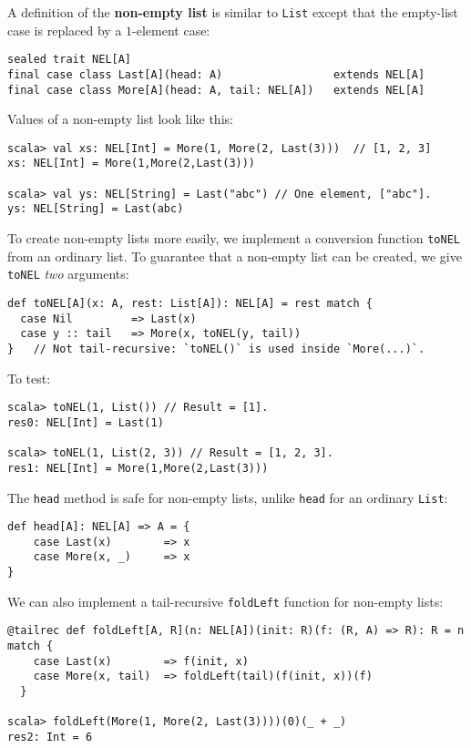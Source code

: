 A definition of the \textbf{non-empty list}
is similar to \lstinline!List! except that the empty-list case is
replaced by a $1$-element case:
\begin{lstlisting}
sealed trait NEL[A]
final case class Last[A](head: A)                 extends NEL[A]
final case class More[A](head: A, tail: NEL[A])   extends NEL[A]
\end{lstlisting}
Values of a non-empty list look like this:
\begin{lstlisting}
scala> val xs: NEL[Int] = More(1, More(2, Last(3)))  // [1, 2, 3]
xs: NEL[Int] = More(1,More(2,Last(3)))

scala> val ys: NEL[String] = Last("abc") // One element, ["abc"].
ys: NEL[String] = Last(abc)
\end{lstlisting}
To create non-empty lists more easily, we implement a conversion function
\lstinline!toNEL! from an ordinary list. To guarantee that a non-empty
list can be created, we give \lstinline!toNEL! \emph{two} arguments:
\begin{lstlisting}
def toNEL[A](x: A, rest: List[A]): NEL[A] = rest match {
  case Nil         => Last(x)
  case y :: tail   => More(x, toNEL(y, tail))
}   // Not tail-recursive: `toNEL()` is used inside `More(...)`.
\end{lstlisting}
To test:
\begin{lstlisting}
scala> toNEL(1, List()) // Result = [1].
res0: NEL[Int] = Last(1)

scala> toNEL(1, List(2, 3)) // Result = [1, 2, 3].
res1: NEL[Int] = More(1,More(2,Last(3)))
\end{lstlisting}

The \lstinline!head! method is safe for non-empty lists, unlike \lstinline!head!
for an ordinary \lstinline!List!:
\begin{lstlisting}
def head[A]: NEL[A] => A = {
    case Last(x)        => x
    case More(x, _)     => x
}
\end{lstlisting}

We can also implement a tail-recursive \lstinline!foldLeft! function
for non-empty lists:
\begin{lstlisting}
@tailrec def foldLeft[A, R](n: NEL[A])(init: R)(f: (R, A) => R): R = n match {
    case Last(x)        => f(init, x)
    case More(x, tail)  => foldLeft(tail)(f(init, x))(f)
  }

scala> foldLeft(More(1, More(2, Last(3))))(0)(_ + _)
res2: Int = 6
\end{lstlisting}


